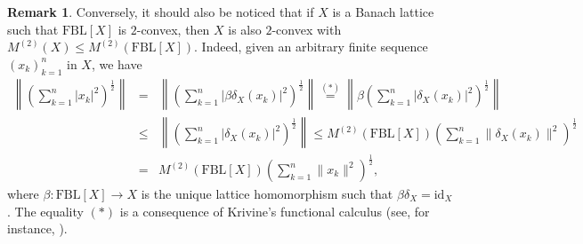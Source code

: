\documentclass[11pt]{amsart}
\newtheorem{lem}[thm]{Lemma}
\theoremstyle{definition}
\newtheorem{rem}[thm]{Remark}
\numberwithin{equation}{section}
\newcommand{\fbl}{\text{FBL}}
\begin{document}
\begin{rem}
Conversely, it should also be noticed that if $X$ is a Banach lattice such that $\fbl[X]$ is $2$-convex, then $X$ is also $2$-convex with $M^{(2)}(X)\leq M^{(2)}(\fbl[X])$. Indeed, given an arbitrary finite sequence $(x_k)_{k=1}^n$ in $X$, we have
\begin{eqnarray*}
\left\|\left(\sum_{k=1}^n|x_k|^2\right)^\frac{1}{2}\right\| &=&  \left\|\left(\sum_{k=1}^n|\beta\delta_X(x_k)|^2\right)^\frac{1}{2}\right\|\overset{(*)}{=}\left\|\beta\left(\sum_{k=1}^n|\delta_X(x_k)|^2\right)^\frac{1}{2}\right\| \\
&\leq& \left\|\left(\sum_{k=1}^n|\delta_X(x_k)|^2\right)^\frac{1}{2}\right\|\leq M^{(2)}(\fbl[X]) \left(\sum_{k=1}^n \|\delta_X(x_k)\|^2\right)^\frac{1}{2} \\
&=& M^{(2)}(\fbl[X]) \left(\sum_{k=1}^n \|x_k\|^2\right)^\frac{1}{2},
\end{eqnarray*}
where $\beta:\fbl[X]\to X$ is the unique lattice homomorphism such that $\beta \delta_X=\text{id}_X$. The equality $(*)$ is a consequence of Krivine's functional calculus (see, for instance, \cite[Lemma 2.1]{JLTTT}).
\end{rem}

\end{document}
